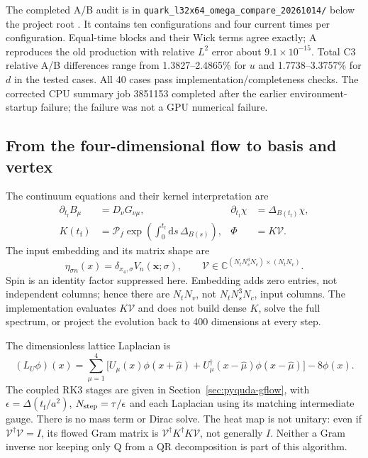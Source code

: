 \documentclass[11pt]{article}
\numberwithin{equation}{section}
\newcommand{\dd}{\mathrm{d}}
\newcommand{\tf}{t_{\mathrm f}}
\begin{document}
The completed A/B audit is in
\nolinkurl{quark_l32x64_omega_compare_20261014/} below the project root
.
It contains ten configurations and four current times per configuration.
Equal-time blocks and their Wick terms agree exactly; A reproduces the
old production with relative \(L^2\) error about \(9.1\times10^{-15}\).
Total C3 relative A/B differences range from 1.3827--2.4865\% for \(u\)
and 1.7738--3.3757\% for \(d\) in the tested cases. All 40 cases pass
implementation/completeness checks. The corrected CPU summary job
3851153 completed after the earlier environment-startup failure; the
failure was not a GPU numerical failure.

\subsection{From the four-dimensional flow to basis and vertex}

The continuum equations and their kernel interpretation are
\begin{align}
 \partial_{\tf} B_\mu&=D_\nu G_{\nu\mu},&
 \partial_{\tf}\chi&=\Delta_{B(\tf)}\chi,\\
 K(\tf)&=\mathcal P_f\exp\!\left(\int_0^{\tf}\dd s\,
       \Delta_{B(s)}\right),&
 \Phi&=K\mathcal V.
\end{align}
The input embedding and its matrix shape are
\begin{equation}
 \eta_{\sigma n}(x)=\delta_{x_4,\sigma}V_n(\bm x;\sigma),\qquad
 \mathcal V\in\mathbb C^{(N_tN_s^3N_c)\times(N_tN_v)}.
\end{equation}
Spin is an identity factor suppressed here. Embedding adds zero entries,
not independent columns; hence there are \(N_tN_v\), not
\(N_tN_s^3N_c\), input columns. The implementation evaluates \(K\mathcal V\)
and does not build dense \(K\), solve the full spectrum, or project the
evolution back to 400 dimensions at every step.

The dimensionless lattice Laplacian is
\begin{equation}
 (L_U\phi)(x)=\sum_{\mu=1}^4\bigl[
 U_\mu(x)\phi(x+\hat\mu)+U_\mu^\dagger(x-\hat\mu)
 \phi(x-\hat\mu)\bigr]-8\phi(x).
\end{equation}
The coupled RK3 stages are given in
Section~\ref{sec:pyquda-gflow}, with \(\epsilon=\Delta(\tf/a^2)\),
\(N_{\rm step}=\tau/\epsilon\) and each Laplacian using its matching
intermediate gauge. There is no mass term or Dirac solve. The heat map is
not unitary: even if \(\mathcal V^\dagger\mathcal V=I\), its flowed
Gram matrix is \(\mathcal V^\dagger K^\dagger K\mathcal V\), not generally
\(I\). Neither a Gram inverse nor keeping only Q from a QR decomposition
is part of this algorithm.
\end{document}
